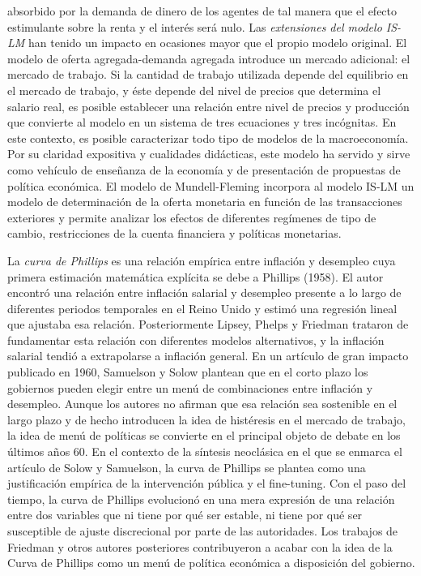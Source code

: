 \documentclass{nuevotema}
\begin{document}
absorbido por la demanda de dinero de los agentes de tal manera que el efecto estimulante sobre la renta y el interés será nulo. Las \textit{extensiones del modelo IS-LM} han tenido un impacto en ocasiones mayor que el propio modelo original. El modelo de oferta agregada-demanda agregada introduce un mercado adicional: el mercado de trabajo. Si la cantidad de trabajo utilizada depende del equilibrio en el mercado de trabajo, y éste depende del nivel de precios que determina el salario real, es posible establecer una relación entre nivel de precios y producción que convierte al modelo en un sistema de tres ecuaciones y tres incógnitas. En este contexto, es posible caracterizar todo tipo de modelos de la macroeconomía. Por su claridad expositiva y cualidades didácticas, este modelo ha servido y sirve como vehículo de enseñanza de la economía y de presentación de propuestas de política económica. El modelo de Mundell-Fleming incorpora al modelo IS-LM un modelo de determinación de la oferta monetaria en función de las transacciones exteriores y permite analizar los efectos de diferentes regímenes de tipo de cambio, restricciones de la cuenta financiera y políticas monetarias.

La \textit{curva de Phillips} es una relación empírica entre inflación y desempleo cuya primera estimación matemática explícita se debe a Phillips (1958). El autor encontró una relación entre inflación salarial y desempleo presente a lo largo de diferentes periodos temporales en el Reino Unido y estimó una regresión lineal que ajustaba esa relación. Posteriormente Lipsey, Phelps y Friedman trataron de fundamentar esta relación con diferentes modelos alternativos, y la inflación salarial tendió a extrapolarse a inflación general. En un artículo de gran impacto publicado en 1960, Samuelson y Solow plantean que en el corto plazo los gobiernos pueden elegir entre un menú de combinaciones entre inflación y desempleo. Aunque los autores no afirman que esa relación sea sostenible en el largo plazo y de hecho introducen la idea de histéresis en el mercado de trabajo, la idea de menú de políticas se convierte en el principal objeto de debate en los últimos años 60. En el contexto de la síntesis neoclásica en el que se enmarca el artículo de Solow y Samuelson, la curva de Phillips se plantea como una justificación empírica de la intervención pública y el fine-tuning. Con el paso del tiempo, la curva de Phillips evolucionó en una mera expresión de una relación entre dos variables que ni tiene por qué ser estable, ni tiene por qué ser susceptible de ajuste discrecional por parte de las autoridades. Los trabajos de Friedman y otros autores posteriores contribuyeron a acabar con la idea de la Curva de Phillips como un menú de política económica a disposición del gobierno.
\end{document}
